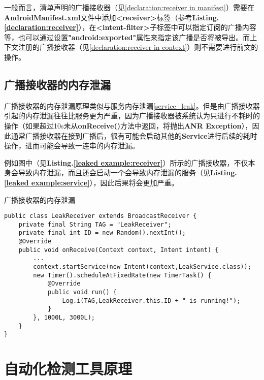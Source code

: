 一般而言，清单声明的广播接收器（见\ref{declaration:receiver in manifest}）需要在\textbf{AndroidManifest.xml}文件中添加\textbf{<receiver>}标签（参考\textbf{Listing.\textcolor{red}{\ref{declaration:receiver}}}），在\textbf{<intent-filter>}子标签中可以指定订阅的广播内容等，也可以通过设置\textbf{"android:exported"}属性来指定该广播是否将被导出。而上下文注册的广播接收器（见\ref{declaration:receiver in context}）则不需要进行前文的操作。
\subsection{广播接收器的内存泄漏}
广播接收器的内存泄漏原理类似与服务内存泄漏\ref{service_leak}。但是由广播接收器引起的内存泄漏往往比服务更为严重，因为广播接收器被系统认为只进行不耗时的操作（如果超过10s未从\textbf{onReceive()}方法中返回，将抛出\textbf{ANR Exception}），因此通常广播接收器在接到广播后，很有可能会启动其他的\textbf{Service}进行后续的耗时操作，进而可能会导致一连串的内存泄漏。

例如图中（见\textbf{Listing.\textcolor{red}{\ref{leaked example:receiver}}}）所示的广播接收器，不仅本身会导致内存泄漏，而且还会启动一个会导致内存泄漏的服务（见\textbf{Listing.\textcolor{red}{\ref{leaked example:service}}}），因此后果将会更加严重。
\begin{listing}[htbp]
	\centering
	\caption{广播接收器的内存泄漏}
	\begin{verbatim}
public class LeakReceiver extends BroadcastReceiver {
	private final String TAG = "LeakReceiver";
	private final int ID = new Random().nextInt();
	@Override
	public void onReceive(Context context, Intent intent) {
		...
		context.startService(new Intent(context,LeakService.class));
		new Timer().scheduleAtFixedRate(new TimerTask() {
			@Override
			public void run() {
				Log.i(TAG,LeakReceiver.this.ID + " is running!");
			}
		}, 1000L, 3000L);
	}
}
	\end{verbatim}
	\label{leaked example:receiver}
\end{listing}
\section{自动化检测工具原理}

